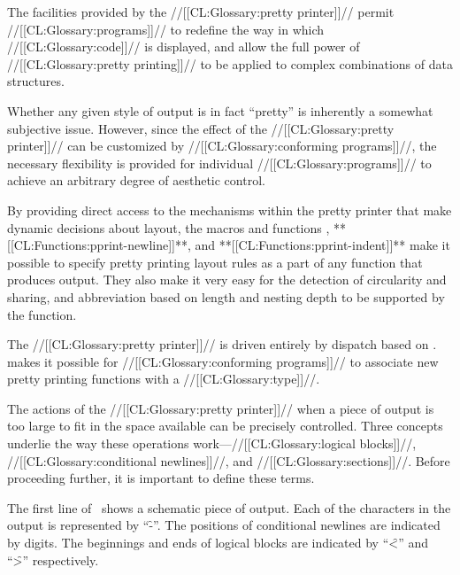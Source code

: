



The facilities provided by the //[[CL:Glossary:pretty printer]]// permit
//[[CL:Glossary:programs]]// to redefine the way in which //[[CL:Glossary:code]]// is displayed, 
and allow the full power of //[[CL:Glossary:pretty printing]]// to be applied 
to complex combinations of data structures.

Whether any given style of output is in fact ``pretty'' is inherently a
somewhat subjective issue.  However, since the effect of the 
//[[CL:Glossary:pretty printer]]// can be customized by //[[CL:Glossary:conforming programs]]//,
the necessary flexibility is provided for individual //[[CL:Glossary:programs]]//
to achieve an arbitrary degree of aesthetic control.

By providing direct access to the mechanisms within the pretty printer
that make dynamic decisions about layout, the macros and functions
, **[[CL:Functions:pprint-newline]]**, and
**[[CL:Functions:pprint-indent]]** make it possible to specify pretty printing
layout rules as a part of any function that produces output.  They also
make it very easy for the detection of circularity and sharing, and
abbreviation based on length and nesting depth to be supported by the
function.

The //[[CL:Glossary:pretty printer]]// is driven entirely by dispatch based on
.
 makes it possible
for //[[CL:Glossary:conforming programs]]// to associate new pretty printing 
functions with a //[[CL:Glossary:type]]//.

 
The actions of the //[[CL:Glossary:pretty printer]]// when a piece of output is too
large to fit in the space available can be precisely controlled.
Three concepts underlie 
the way these operations work---//[[CL:Glossary:logical blocks]]//,
			        //[[CL:Glossary:conditional newlines]]//,
			    and //[[CL:Glossary:sections]]//.
Before proceeding further, it is important to define these terms.
 
The first line of \thenextfigure\ shows a schematic piece of output.  Each of
the characters in the output is represented by ``\f{-}''.  The positions of
conditional newlines are indicated by digits.  The beginnings and ends of
logical blocks are indicated by ``\f{<}'' and ``\f{>}'' respectively.
 

